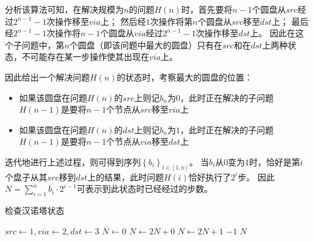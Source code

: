 \begin{questions}
\begin{solution}
\begin{parts}
{            分析该算法可知，在解决规模为$n$的问题$H(n)$时，首先要将$n-1$个圆盘从$src$经过$2^{n-1}-1$次操作移至$via$上；
            然后经$1$次操作将第$n$个圆盘从$src$移至$dst$上；
            最后经$2^{n-1}-1$次操作将$n-1$个圆盘从$via$经过$2^{n-1}-1$次操作移至$dst$上。
            因此在这个子问题中，第$n$个圆盘（即该问题中最大的圆盘）只有在$src$和在$dst$上两种状态，不可能存在某一步操作使其出现在$via$上。

            因此给出一个解决问题$H(n)$的状态时，考察最大的圆盘的位置：
            \begin{itemize}
                \item 如果该圆盘在问题$H(n)$的$src$上则记$b_n$为$0$，此时正在解决的子问题$H(n-1)$是要将$n-1$个节点从$src$移至$via$上
                \item 如果该圆盘在问题$H(n)$的$dst$上则记$b_n$为$1$，此时正在解决的子问题$H(n-1)$是要将$n-1$个节点从$via$移至$dst$上
            \end{itemize}
            迭代地进行上述过程，则可得到序列$\left\{b_i\right\}_{i \in [1, n]}$。
            当$b_i$从$0$变为$1$时，恰好是第$i$个盘子从其$src$移到$dst$上的结果，此时问题$H(i)$恰好执行了$2^i$步。
            因此$N = \sum_{i=1}^n{b_i \cdot 2^{i-1}}$可表示到此状态时已经经过的步数。

            \begin{algorithm}[H]
                \caption{检查汉诺塔状态}
                \begin{algorithmic}[1]
                    \State $src \gets 1, via \gets 2, dst \gets 3$
                    \State $N \gets 0$
                    \State $N \gets 2N + 0$
                    \State {}
                    \State $N \gets 2N + 1$
                    \State {}
                    \Else
                    \State \Return $-1$
                    \EndIf
                    \EndFor
                    \State \Return $N$
                \end{algorithmic}
            \end{algorithm}

            }
        \end{parts}
    \end{solution}




\end{questions}
